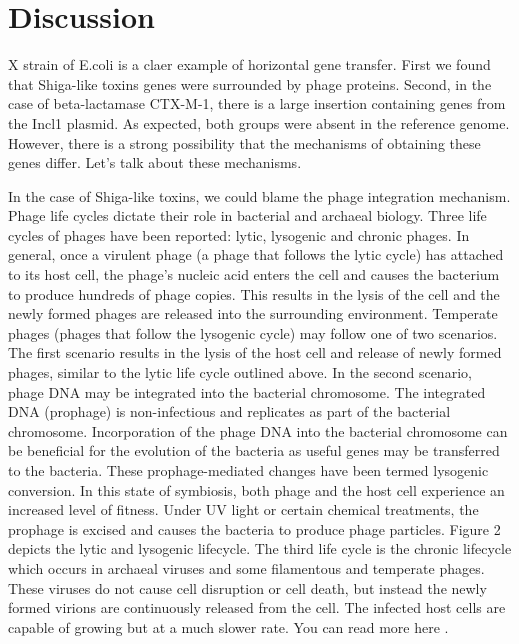 \documentclass{article}
\begin{document}
  
\section{Discussion}
X strain of E.coli is a claer example of horizontal gene transfer. First we found that Shiga-like toxins genes were surrounded by phage proteins. Second, in the case of beta-lactamase CTX-M-1, there is a large insertion containing genes from the Incl1 plasmid. As expected, both groups were absent in the reference genome. However, there is a strong possibility that the mechanisms of obtaining these genes differ. Let's talk about these mechanisms.

In the case of Shiga-like toxins, we could blame the phage integration mechanism. Phage life cycles dictate their role in bacterial and archaeal biology. Three life cycles of phages have been reported: lytic, lysogenic and chronic phages. In general, once a virulent phage (a phage that follows the lytic cycle) has attached to its host cell, the phage’s nucleic acid enters the cell and causes the bacterium to produce hundreds of phage copies. This results in the lysis of the cell and the newly formed phages are released into the surrounding environment. Temperate phages (phages that follow the lysogenic cycle) may follow one of two scenarios. The first scenario results in the lysis of the host cell and release of newly formed phages, similar to the lytic life cycle outlined above. In the second scenario, phage DNA may be integrated into the bacterial chromosome. The integrated DNA (prophage) is non-infectious and replicates as part of the bacterial chromosome. Incorporation of the phage DNA into the bacterial chromosome can be beneficial for the evolution of the bacteria as useful genes may be transferred to the bacteria. These prophage-mediated changes have been termed lysogenic conversion. In this state of symbiosis, both phage and the host cell experience an increased level of fitness. Under UV light or certain chemical treatments, the prophage is excised and causes the bacteria to produce phage particles. Figure 2 depicts the lytic and lysogenic lifecycle. The third life cycle is the chronic lifecycle which occurs in archaeal viruses and some filamentous and temperate phages. These viruses do not cause cell disruption or cell death, but instead the newly formed virions are continuously released from the cell. The infected host cells are capable of growing but at a much slower rate. You can read more here \cite{ncb}.
\end{document}

